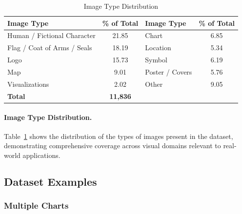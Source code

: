 \documentclass[11pt]{article}
\begin{document}
\begin{table}[htbp]
\vspace{-0.5em}
\centering
\scriptsize
\setlength{\aboverulesep}{0pt}
\setlength{\belowrulesep}{0pt}
\setlength{\tabcolsep}{4pt}
\begin{tabular}{lc|lc}
    \toprule
    \textbf{Image Type} & \textbf{\% of Total} &\textbf{Image Type} & \textbf{\% of Total}\\
    \midrule
    Human / Fictional Character      & 21.85 & Chart                            &  6.85 \\
    Flag / Coat of Arms / Seals      & 18.19 & Location                         &  5.34 \\
    Logo                             & 15.73 &  Symbol                           &  6.19 \\
    Map                              &  9.01 & Poster / Covers                  &  5.76 \\
    Visualizations                   &  2.02 &   Other                            &  9.05 \\
    \midrule
    \textbf{Total}                   & \textbf{11,836} \\
    \bottomrule
\end{tabular}
\vspace{-1.0em}
\caption{\small Image Type Distribution}
\label{tab:image_distribution}
\vspace{-1.0em}
\end{table}
\vspace{-0.5em}

\paragraph{Image Type Distribution.} Table~\ref{tab:image_distribution} shows the distribution of the types of images present in the dataset, demonstrating comprehensive coverage across visual domains relevant to real-world applications.

\subsection{Dataset Examples}

\subsubsection*{Multiple Charts}
\end{document}
